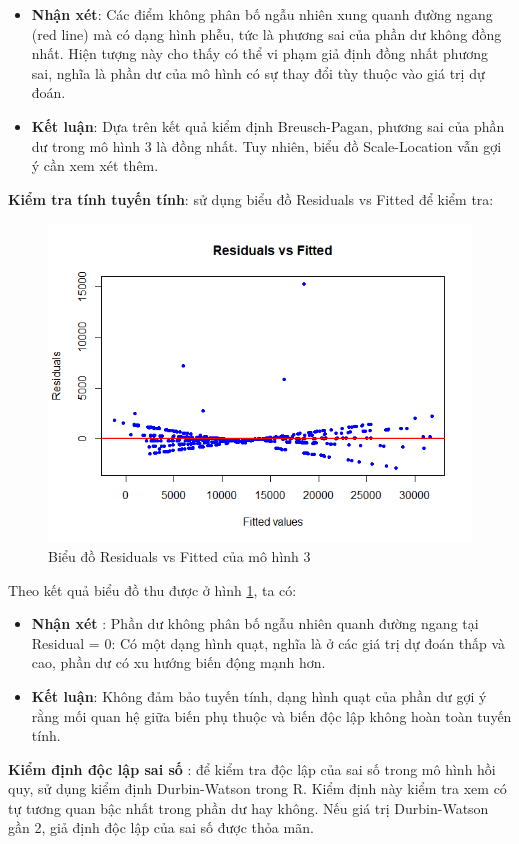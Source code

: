 \begin{itemize}
  \item\textbf{Nhận xét}: Các điểm không phân bố ngẫu nhiên xung quanh đường ngang (red line) mà có dạng hình phễu, tức là phương sai của phần dư không đồng nhất. Hiện tượng này cho thấy có thể vi phạm giả định đồng nhất phương sai, nghĩa là phần dư của mô hình có sự thay đổi tùy thuộc vào giá trị dự đoán.
  \item\textbf{Kết luận}: Dựa trên kết quả kiểm định Breusch-Pagan, phương sai của phần dư trong mô hình 3 là đồng nhất.
  Tuy nhiên, biểu đồ Scale-Location vẫn gợi ý cần xem xét thêm.
\end{itemize}

\textbf{Kiểm tra tính tuyến tính}: sử dụng biểu đồ Residuals vs Fitted để kiểm tra:

\begin{figure}[H]
  \centering
  \includegraphics[width=0.7\linewidth]{graphics/5.5.12.png}
  \caption{Biểu đồ Residuals vs Fitted của mô hình 3 }
  \label{kd5}
\end{figure}
Theo kết quả biểu đồ thu được ở hình \ref{kd5}, ta có:

\begin{itemize}
\item\textbf{Nhận xét }: Phần dư không phân bố ngẫu nhiên quanh đường ngang tại Residual = 0: Có một dạng hình quạt, nghĩa là ở các giá trị dự đoán thấp và cao, phần dư có xu hướng biến động mạnh hơn.
\item\textbf{Kết luận}: Không đảm bảo tuyến tính, dạng hình quạt của phần dư gợi ý rằng mối quan hệ giữa biến phụ thuộc và biến độc lập không hoàn toàn tuyến tính.
\end{itemize}


\textbf{Kiểm định độc lập sai số} : để kiểm tra độc lập của sai số trong mô hình hồi quy, sử dụng kiểm định Durbin-Watson trong R. Kiểm định này kiểm tra xem có tự tương quan bậc nhất trong phần dư hay không. Nếu giá trị Durbin-Watson gần 2, giả định độc lập của sai số được thỏa mãn.

